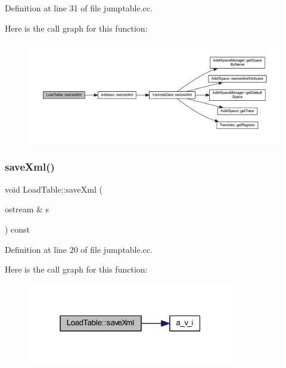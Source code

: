 Definition at line 31 of file jumptable.\+cc.

Here is the call graph for this function\+:
\nopagebreak
\begin{figure}[H]
\begin{center}
\leavevmode
\includegraphics[width=350pt]{class_load_table_a4db003d9f9ded3dce940fa9644b5874d_cgraph}
\end{center}
\end{figure}
\mbox{\label{class_load_table_a043aa8df51613f233226f8633aff14eb}} 
\subsubsection{\texorpdfstring{saveXml()}{saveXml()}}
{\footnotesize\ttfamily void Load\+Table\+::save\+Xml (\begin{DoxyParamCaption}\item[{ostream \&}]{s }\end{DoxyParamCaption}) const}



Definition at line 20 of file jumptable.\+cc.

Here is the call graph for this function\+:
\nopagebreak
\begin{figure}[H]
\begin{center}
\leavevmode
\includegraphics[width=256pt]{class_load_table_a043aa8df51613f233226f8633aff14eb_cgraph}
\end{center}
\end{figure}


